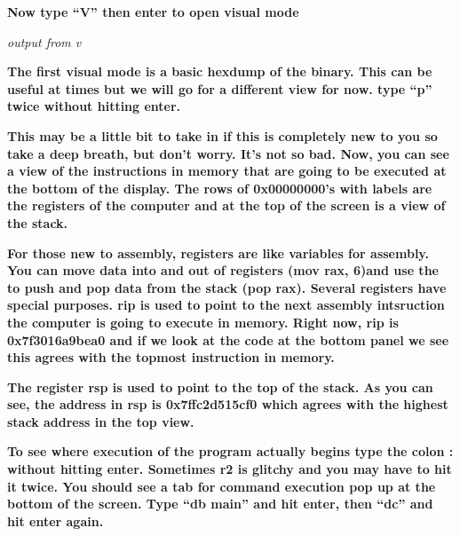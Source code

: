 \textbf{Now type ``V'' then enter to open visual mode}

  
 

\textit{output from v}

\textbf{The first visual mode is a basic hexdump of the binary. This can be useful at times but we will go for a
different view for now. type ``p'' twice without hitting enter.}

  
 

\textbf{This may be a little bit to take in if this is completely new to you so take a deep breath, but don't worry.
It's not so bad. Now, you can see a view of the instructions in memory that are going to be executed at the bottom of
the display. The rows of 0x00000000's with labels are the registers of the computer and at the top of the screen is a
view of the stack.}

  
 

\textbf{For those new to assembly, registers are like variables for assembly. You can move data into and out of
registers (mov rax, 6)and use the to push and pop data from the stack (pop rax). Several registers have special
purposes. rip is used to point to the next assembly intsruction the computer is going to execute in memory. Right now,
rip is 0x7f3016a9bea0 and if we look at the code at the bottom panel we see this agrees with the topmost instruction in
memory.}

  
 

\textbf{The register rsp is used to point to the top of the stack. As you can see, the address in rsp is 0x7ffc2d515cf0
which agrees with the highest stack address in the top view.}

  
 

\textbf{To see where execution of the program actually begins type the colon : without hitting enter. Sometimes r2 is
glitchy and you may have to hit it twice. You should see a tab for command execution pop up at the bottom of the
screen. Type ``db main'' and hit enter, then ``dc'' and hit enter again.}

  
 

